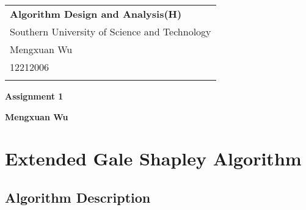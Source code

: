 \documentclass[a4paper,12pt]{article}
\begin{document}
\thispagestyle{empty} %

\begin{tabular}{p{15.5cm}}
{\large \bf Algorithm Design and Analysis(H)} \\
Southern University of Science and Technology \\ Mengxuan Wu \\ 12212006 \\
\hline
\\
\end{tabular}

\vspace*{0.3cm} %

\begin{center}
	{\Large \bf Assignment 1}
	\vspace{2mm}

	{\bf Mengxuan Wu}
		
\end{center}  

\vspace{0.4cm}

\section*{Extended Gale Shapley Algorithm}

\subsection*{Algorithm Description}
\end{document}
